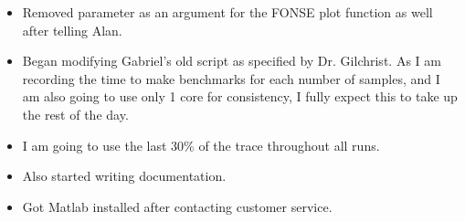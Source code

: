 \documentclass[12pt,hyperref]{labbook}
\begin{document}

\begin{itemize}
    \item Removed parameter as an argument for the FONSE plot function as well after telling Alan.
    \item Began modifying Gabriel's old script as specified by Dr. Gilchrist.
    As I am recording the time to make benchmarks for each number of samples, and I am also going to use only 1 core for consistency, I fully expect this to take up the rest of the day.
    \item I am going to use the last 30\% of the trace throughout all runs.
    \item Also started writing documentation.
    \item Got Matlab installed after contacting customer service.
\end{itemize}

\end{document}
